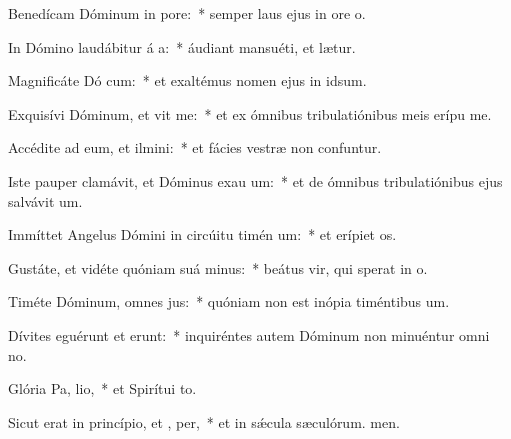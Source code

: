 \item Benedícam Dóminum in  pore:~* semper laus ejus in ore o.
\item In Dómino laudábitur á a:~* áudiant mansuéti, et lætur.
\item Magnificáte Dó cum:~* et exaltémus nomen ejus in idsum.
\item Exquisívi Dóminum, et vit me:~* et ex ómnibus tribulatiónibus meis erípu me.
\item Accédite ad eum, et ilmini:~* et fácies vestræ non confuntur.
\item Iste pauper clamávit, et Dóminus exau um:~* et de ómnibus tribulatiónibus ejus salvávit um.
\item Immíttet Angelus Dómini in circúitu timén um:~* et erípiet os.
\item Gustáte, et vidéte quóniam suá  minus:~* beátus vir, qui sperat in o.
\item Timéte Dóminum, omnes  jus:~* quóniam non est inópia timéntibus um.
\item Dívites eguérunt et erunt:~* inquiréntes autem Dóminum non minuéntur omni no.
\item Glória Pa,  lio,~* et Spirítui to.
\item Sicut erat in princípio, et ,  per,~* et in sǽcula sæculórum. men.

